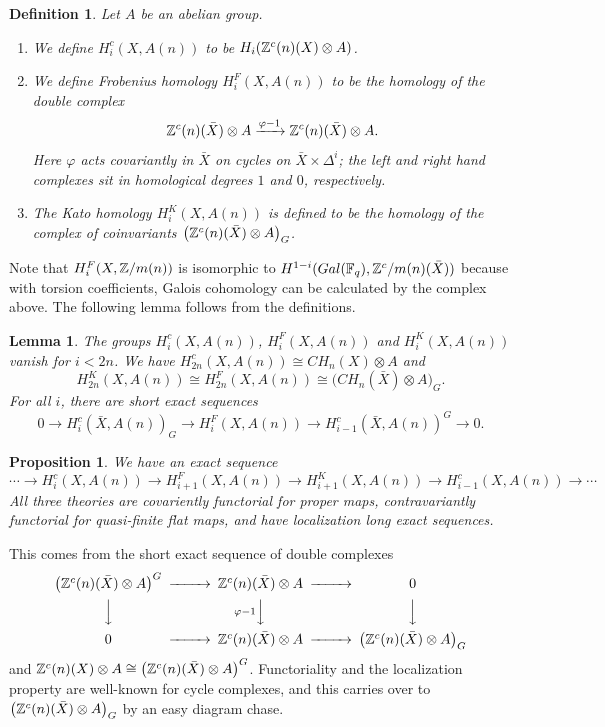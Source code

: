 \documentclass[nospthms,envcountsect]{svmult} %
\newtheorem{lemma}      [theorem]       {Lemma}
\newtheorem{proposition}[theorem]       {Proposition}
\newtheorem{definition} [theorem]       {Definition}
\begin{document}
\begin{definition}\label{def1}
Let $A$ be an abelian group.
\begin{enumerate}
\item We define $H_i^c(X,A(n))$ to be $H_i({{\mathbb Z}}^c(n)(X)\otimes A)$.
\item We define Frobenius homology $H_i^F(X,A(n))$ 
to be the homology of the double complex 
$$ {{\mathbb Z}}^c(n)(\bar X)\otimes A \xrightarrow{\varphi-1} {{\mathbb Z}}^c(n)(\bar X)\otimes A.$$
Here $\varphi$ acts covariantly in
$\bar X$ on cycles on $\bar X\times \Delta^i$; the left and right hand 
complexes sit in homological degrees $1$ and $0$, respectively.
\item The Kato homology $H_i^K(X,A(n))$ 
is defined to be the homology of the complex of coinvariants
$\big({{\mathbb Z}}^c(n)(\bar X)\otimes A\big)_G$.
\end{enumerate}
\end{definition}


Note that $H_i^F(X,{{\mathbb Z}}/m(n))$ is isomorphic to 
$H^{1-i}(Gal({{\mathbb F}}_q),{{\mathbb Z}}^c/m(n)(\bar X))$ because with torsion coefficients,
Galois cohomology can be calculated by the complex above.
The following lemma follows from the definitions.


\begin{lemma}\label{lem1}
The groups  $H_i^c(X,A(n))$, $H_i^F(X,A(n))$ and $H_i^K(X,A(n))$ 
vanish for $i<2n$.
We have $H_{2n}^c(X,A(n))\cong CH_n(X)\otimes A$ and
$$H_{2n}^K(X,A(n))\cong H_{2n}^F(X,A(n))
\cong \big( CH_n(\bar X)\otimes A\big)_G.$$
For all $i$, there are short exact sequences
\begin{equation}\label{yyy}
0\to H_i^c(\bar X,A(n))_G\to 
H_i^F(X,A(n))\to H_{i-1}^c(\bar X,A(n))^G \to 0.
\end{equation}
\end{lemma}




\begin{proposition}\label{prop1}
We have an exact sequence 
\begin{equation}\label{homd}
\cdots\to H_i^c(X,A(n)) \to H_{i+1}^F(X,A(n))\to H_{i+1}^K(X,A(n)) \to 
H_{i-1}^c(X,A(n)) \to \cdots 
\end{equation}
All three theories are covariently functorial for proper maps,
contravariantly functorial for quasi-finite flat maps,
and have localization long exact sequences.
\end{proposition}


\proof 
This comes from the short exact sequence of double complexes
$$\begin{CD}
\big( \Z^c(n)(\bar X)\otimes A\big)^G@>>> 
\Z^c(n)(\bar X)\otimes A@>>> 0 \\
@VVV @V\varphi-1 VV@VVV \\
0@>>> \Z^c(n)(\bar X)\otimes A @>>> 
\big(\Z^c(n)(\bar X)\otimes A\big)_G
\end{CD}$$
and ${{\mathbb Z}}^c(n)(X)\otimes A\cong \big({{\mathbb Z}}^c(n)(\bar X)\otimes A\big)^G$.
Functoriality and the localization property are well-known
for cycle complexes, and this carries over to 
$\big( {{\mathbb Z}}^c(n)(\bar X)\otimes A\big)_G$ by an easy diagram chase.
\proofend
\end{document}
